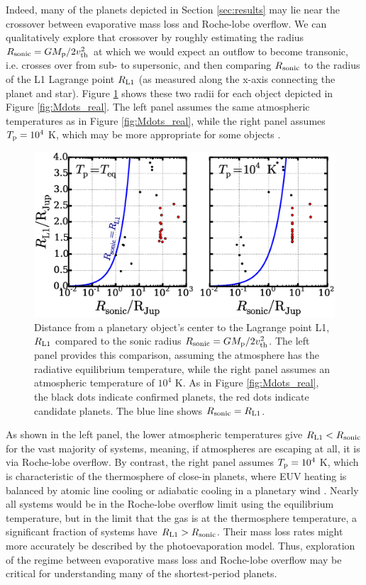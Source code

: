 \documentclass{aastex}
\begin{document}
Indeed, many of the planets depicted in Section \ref{sec:results} may lie near the crossover between evaporative mass loss and Roche-lobe overflow. We can qualitatively explore that crossover by roughly estimating the radius $R_{\rm sonic} = G M_{\rm p}/2 v_{\rm th}^2$ at which we would expect an outflow to become transonic, i.e. crosses over from sub- to supersonic, and then comparing $R_{\rm sonic}$ to the radius of the L1 Lagrange point $R_{\rm L1}$ (as measured along the x-axis connecting the planet and star). Figure \ref{fig:comparing_sonic_and_Roche_radii} shows these two radii for each object depicted in Figure \ref{fig:Mdots_real}. The left panel assumes the same atmospheric temperatures as in Figure \ref{fig:Mdots_real}, while the right panel assumes $T_{\rm p} = 10^4$ K, which may be more appropriate for some objects \citep{2011ApJ...728..152T}.

\begin{figure}
\includegraphics[width=\textwidth]{comparing_sonic_and_Roche_radii}
\caption{Distance from a planetary object's center to the Lagrange point L1, $R_{\rm L1}$ compared to the sonic radius $R_{\rm sonic} = G M_{\rm p}/2 v_{\rm th}^2$. The left panel provides this comparison, assuming the atmosphere has the radiative equilibrium temperature, while the right panel assumes an atmospheric temperature of $10^4$ K. As in Figure \ref{fig:Mdots_real}, the black dots indicate confirmed planets, the red dots indicate candidate planets. The blue line shows $R_{\rm sonic} = R_{\rm L1}$. }
\label{fig:comparing_sonic_and_Roche_radii}
\end{figure}

As shown in the left panel, the lower atmospheric temperatures give $R_{\rm L1} < R_{\rm sonic}$ for the vast majority of systems, meaning, if atmospheres are escaping at all, it is via Roche-lobe overflow. By contrast, the right panel assumes $T_{\rm p} = 10^4$ K, which is characteristic of the thermosphere of close-in planets, where EUV heating is balanced by atomic line cooling or adiabatic cooling in a planetary wind \citep{2004Icar..170..167Y}. Nearly all systems would be in the Roche-lobe overflow limit using the equilibrium temperature, but in the limit that the gas is at the thermosphere temperature, a significant fraction of systems have $R_{\rm L1} > R_{\rm sonic}$. Their mass loss rates might more accurately be described by the photoevaporation model. Thus, exploration of the regime between evaporative mass loss and Roche-lobe overflow may be critical for understanding many of the shortest-period planets. 
\end{document}
